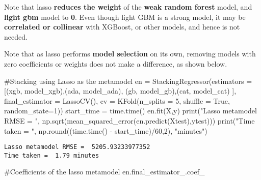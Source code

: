 \documentclass[
  letterpaper,
  DIV=11,
  numbers=noendperiod]{scrreprt}
\newenvironment{Shaded}{\begin{snugshade}}{\end{snugshade}}
\newcommand{\BuiltInTok}[1]{\textcolor[rgb]{0.00,0.23,0.31}{#1}}
\newcommand{\CommentTok}[1]{\textcolor[rgb]{0.37,0.37,0.37}{#1}}
\newcommand{\DecValTok}[1]{\textcolor[rgb]{0.68,0.00,0.00}{#1}}
\newcommand{\NormalTok}[1]{\textcolor[rgb]{0.00,0.23,0.31}{#1}}
\newcommand{\OperatorTok}[1]{\textcolor[rgb]{0.37,0.37,0.37}{#1}}
\newcommand{\StringTok}[1]{\textcolor[rgb]{0.13,0.47,0.30}{#1}}
\newcommand{\VariableTok}[1]{\textcolor[rgb]{0.07,0.07,0.07}{#1}}
\begin{document}
Note that lasso \textbf{reduces the weight} of the \textbf{weak random
forest} model, and \textbf{light gbm} model to \textbf{0}. Even though
light GBM is a strong model, it may be \textbf{correlated or collinear}
with XGBoost, or other models, and hence is not needed.

Note that as lasso performs \textbf{model selection} on its own,
removing models with zero coefficients or weights does not make a
difference, as shown below.

\begin{Shaded}
\begin{Highlighting}[]
\CommentTok{\#Stacking using Lasso as the metamodel}
\NormalTok{en }\OperatorTok{=}\NormalTok{ StackingRegressor(estimators }\OperatorTok{=}\NormalTok{ [(}\StringTok{\textquotesingle{}xgb\textquotesingle{}}\NormalTok{, model\_xgb),(}\StringTok{\textquotesingle{}ada\textquotesingle{}}\NormalTok{, model\_ada),}
\NormalTok{                        (}\StringTok{\textquotesingle{}gb\textquotesingle{}}\NormalTok{, model\_gb),(}\StringTok{\textquotesingle{}cat\textquotesingle{}}\NormalTok{, model\_cat) ],}
\NormalTok{                     final\_estimator }\OperatorTok{=}\NormalTok{ LassoCV(),                                          }
\NormalTok{                    cv }\OperatorTok{=}\NormalTok{ KFold(n\_splits }\OperatorTok{=} \DecValTok{5}\NormalTok{, shuffle }\OperatorTok{=} \VariableTok{True}\NormalTok{, random\_state}\OperatorTok{=}\DecValTok{1}\NormalTok{))}
\NormalTok{start\_time }\OperatorTok{=}\NormalTok{ time.time()}
\NormalTok{en.fit(X,y)}
\BuiltInTok{print}\NormalTok{(}\StringTok{"Lasso metamodel RMSE = "}\NormalTok{, np.sqrt(mean\_squared\_error(en.predict(Xtest),ytest)))}
\BuiltInTok{print}\NormalTok{(}\StringTok{"Time taken = "}\NormalTok{, np.}\BuiltInTok{round}\NormalTok{((time.time() }\OperatorTok{{-}}\NormalTok{ start\_time)}\OperatorTok{/}\DecValTok{60}\NormalTok{,}\DecValTok{2}\NormalTok{), }\StringTok{"minutes"}\NormalTok{)}
\end{Highlighting}
\end{Shaded}

\begin{verbatim}
Lasso metamodel RMSE =  5205.93233977352
Time taken =  1.79 minutes
\end{verbatim}

\begin{Shaded}
\begin{Highlighting}[]
\CommentTok{\#Coefficients of the lasso metamodel}
\NormalTok{en.final\_estimator\_.coef\_}
\end{Highlighting}
\end{Shaded}
\end{document}
